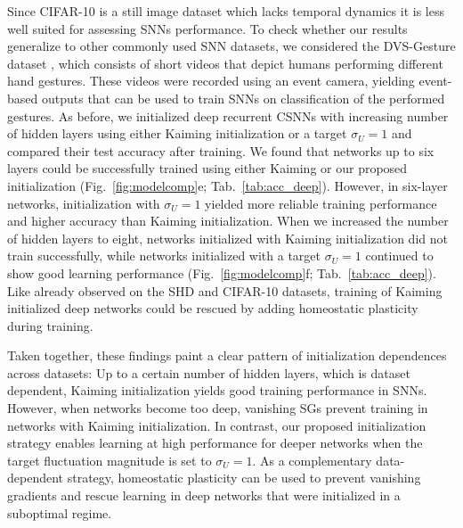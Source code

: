 \documentclass[11pt,a4paper]{article}
\begin{document}
Since CIFAR-10 is a still image dataset which lacks temporal dynamics it is less well suited for assessing \acp{SNN} performance. 
To check whether our results generalize to other commonly used \ac{SNN} datasets, we considered the DVS-Gesture dataset \citep{Amir2017-ks}, which consists of short videos that depict humans performing different hand gestures.
These videos were recorded using an event camera, yielding event-based outputs that can be used to train \acp{SNN} on classification of the performed gestures.
As before, we initialized deep recurrent \acp{CSNN} with increasing number of hidden layers using either Kaiming initialization or a target $\sigma_U = 1$ and compared their test accuracy after training.
We found that networks up to six layers could be successfully trained using either Kaiming or our proposed initialization (Fig.~\ref{fig:modelcomp}e; Tab.~\ref{tab:acc_deep}).
However, in six-layer networks, initialization with $\sigma_U = 1$ yielded more reliable training performance and higher accuracy than Kaiming initialization.
When we increased the number of hidden layers to eight, networks initialized with Kaiming initialization did not train successfully, while networks initialized with a target $\sigma_U = 1$ continued to show good learning performance (Fig.~\ref{fig:modelcomp}f; Tab.~\ref{tab:acc_deep}).
Like already observed on the SHD and CIFAR-10 datasets, training of Kaiming initialized deep networks could be rescued by adding homeostatic plasticity during training. 

Taken together, these findings paint a clear pattern of initialization dependences across datasets: 
Up to a certain number of hidden layers, which is dataset dependent, Kaiming initialization yields good training performance in \acp{SNN}. 
However, when networks become too deep, vanishing \acp{SG} prevent training in networks with Kaiming initialization. 
In contrast, our proposed initialization strategy enables learning at high performance for deeper networks when the target fluctuation magnitude is set to $\sigma_U=1$.
As a complementary data-dependent strategy, homeostatic plasticity can be used to prevent vanishing gradients and rescue learning in deep networks that were initialized in a suboptimal regime.
\end{document}
